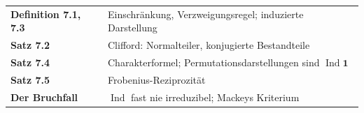 \begin{merksatz}
\begin{center}
\renewcommand{\arraystretch}{1.5}
\begin{tabular}{@{}P{3.0cm}P{5.6cm}@{}}
\toprule
\textbf{Definition 7.1, 7.3} & Einschränkung, Verzweigungsregel; induzierte Darstellung\\
\textbf{Satz 7.2} & Clifford: Normalteiler, konjugierte Bestandteile\\
\textbf{Satz 7.4} & Charakterformel; Permutationsdarstellungen sind $\operatorname{Ind}\mathbf 1$\\
\textbf{Satz 7.5} & Frobenius-Reziprozität\\
\textbf{Der Bruchfall} & $\operatorname{Ind}$ fast nie irreduzibel; Mackeys Kriterium\\
\bottomrule
\end{tabular}
\end{center}

\begin{center}
\begin{minipage}{0.88\textwidth}
\end{minipage}
\end{center}
\end{merksatz}
